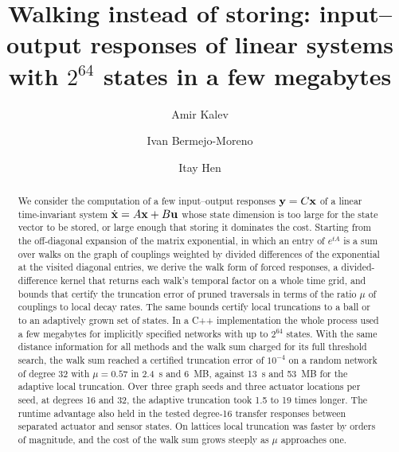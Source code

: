 \documentclass[aps,pra,superscriptaddress,floatfix,longbibliography,twocolumn]{revtex4-2}
\newcommand{\bx}{{\bf x}}
\newcommand{\bu}{{\bf u}}
\newcommand{\by}{{\bf y}}
\begin{document}
\title{Walking instead of storing: input--output responses of linear systems with $2^{64}$ states in a few megabytes}
\author{Amir Kalev}
\author{Ivan Bermejo-Moreno}
\author{Itay Hen}

\begin{abstract}
We consider the computation of a few input--output responses $\by=C\bx$ of a linear time-invariant system $\dot\bx=A\bx+B\bu$ whose state dimension is too large for the state vector to be stored, or large enough that storing it dominates the cost. Starting from the off-diagonal expansion of the matrix exponential, in which an entry of $e^{tA}$ is a sum over walks on the graph of couplings weighted by divided differences of the exponential at the visited diagonal entries, we derive the walk form of forced responses, a divided-difference kernel that returns each walk's temporal factor on a whole time grid, and bounds that certify the truncation error of pruned traversals in terms of the ratio $\mu$ of couplings to local decay rates. The same bounds certify local truncations to a ball or to an adaptively grown set of states. In a C++ implementation the whole process used a few megabytes for implicitly specified networks with up to $2^{64}$ states. With the same distance information for all methods and the walk sum charged for its full threshold search, the walk sum reached a certified truncation error of $10^{-4}$ on a random network of degree 32 with $\mu=0.57$ in 2.4~s and 6~MB, against 13~s and 53~MB for the adaptive local truncation. Over three graph seeds and three actuator locations per seed, at degrees 16 and 32, the adaptive truncation took 1.5 to 19 times longer. The runtime advantage also held in the tested degree-16 transfer responses between separated actuator and sensor states. On lattices local truncation was faster by orders of magnitude, and the cost of the walk sum grows steeply as $\mu$ approaches one.
\end{abstract}
\maketitle
\end{document}

